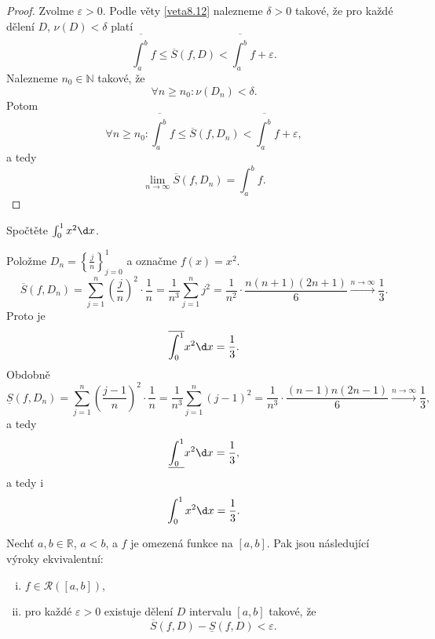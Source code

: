 \begin{proof}
	Zvolme $\varepsilon > 0$. Podle věty \ref{veta8.12} nalezneme $\delta >0$ takové, že pro každé
	dělení $D$, $\nu(D)<\delta$ platí
	$$
	    \overline{\int_a^b}f \leq \overline{S}(f,D)<\overline{\int_a^b}f + \varepsilon.
	$$
	Nalezneme $n_0 \in \mathbb N $ takové, že
	$$
	    \forall n \geq n_0: \nu(D_n)<\delta.
	$$
	Potom
	$$
	    \forall n \geq n_0: \overline{\int_a^b}f \leq \overline{S}(f,D_n) < \overline{\int_a^b}f+\varepsilon,
	$$
	a tedy
	$$
 \lim_{n \to \infty} \overline{S}(f,D_n) = \int_a^b f.
	$$
\end{proof}

\begin{priklad}
	Spočtěte $\int_0^1 x^2\d x$.
	\par Položme $D_n = \left \{ \frac{j}{n} \right \}_{j=0}^1 $ a označme $f(x)=x^2$.
		$$
		\overline{S}(f,D_n) = \sum_{j=1}^n \left( \frac{j}{n} \right )^2 \cdot \frac{1}{n} = \frac{1}{n^3} \sum_{j=1}^n j^2 = \frac{1}{n^2} \cdot \frac{n(n+1)(2n+1)}{6} \stackrel{n\to \infty}{\longrightarrow} \frac{1}{3}.
		$$
		Proto je
		$$
		    \overline{\int_0^1}  x^2 \d x = \frac{1}{3}.
		$$
		Obdobně
		$$
		\underline{S}(f,D_n) = \sum_{j=1}^n \left( \frac{j-1}{n} \right )^2 \cdot \frac{1}{n} = \frac{1}{n^3}\sum_{j=1}^n (j-1)^2 = \frac{1}{n^3}\cdot \frac{(n-1)n(2n-1)}{6}\stackrel{n\to \infty}{\longrightarrow} \frac{1}{3} ,
		$$
		a tedy
		$$
		    \underline{\int _0^1}x^2 \d x = \frac{1}{3},
		$$
		a tedy i
		$$
		    \int_0^1 x^2 \d x = \frac{1}{3}.
		$$
\end{priklad}

\begin{veta}\label{veta8.14}
Nechť $a,b \in \mathbb{R}$, $a<b$, a $f$ je omezená funkce na $[a,b]$. Pak jsou následující výroky ekvivalentní:
\begin{enumerate}[(i)]
	\item $f \in \mathcal R([a,b])$,
	\item pro každé $\varepsilon > 0$ existuje dělení $D$ intervalu $[a,b]$ takové, že
\[
\overline{S}(f,D) - \underline{S}(f,D) < \varepsilon.
\]
\end{enumerate}
\end{veta}

